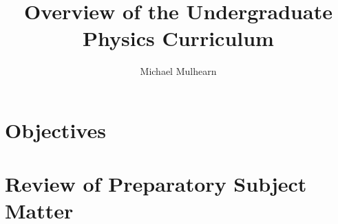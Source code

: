 \documentclass[12pt]{article}
\begin{document}

\title{Overview of the Undergraduate Physics Curriculum}
\author{Michael Mulhearn}

\maketitle

\section{Objectives}

\section{Review of Preparatory Subject Matter}
\end{document}
